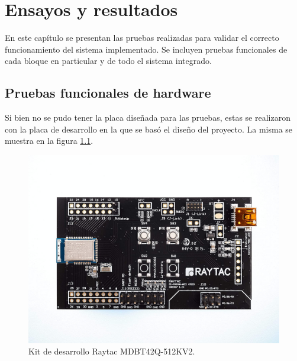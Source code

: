 
\chapter{Ensayos y resultados} %

\label{Chapter4} %

En este capítulo se presentan las pruebas realizadas para validar el correcto funcionamiento del sistema implementado. Se incluyen pruebas funcionales de cada bloque en particular y de todo el sistema integrado.


\section{Pruebas funcionales de hardware}
\label{sec:pruebasHW}

Si bien no se pudo tener la placa diseñada para las pruebas, estas se realizaron con la placa de desarrollo en la que se basó el diseño del proyecto. La misma se muestra en la figura \ref{fig:KDRaytac}.

\begin{figure}[htpb]
	\centering
	\includegraphics[scale=0.15]{./Figures/DKMDBT42Q-512KV2.jpg}
	\caption{Kit de desarrollo Raytac MDBT42Q-512KV2.}
	\label{fig:KDRaytac}
\end{figure}

